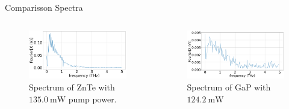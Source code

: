 \documentclass[aspectratio=1610, 9pt]{beamer}
\begin{document}
\begin{frame}{Comparisson Spectra}
  \begin{columns}
    \begin{column}{.5\textwidth}
  \begin{figure}
    \includegraphics[width=\textwidth]{images/2_11_30_20normalFX.pdf}
    \caption{\textcolor{tugreen}{Spectrum} of ZnTe with $\SI{135.0}{\milli\W}$ pump power.}
  \end{figure}
  \end{column}
  \begin{column}{.5\textwidth}
    \begin{figure}
      \includegraphics[width=\textwidth]{images/GaP14_55_42normalFX.pdf}
      \caption{\textcolor{tugreen}{Spectrum} of GaP with $\SI{124.2}{\milli\W }$}
    \end{figure}    
  \end{column}
  \end{columns}
\end{frame}
\end{document}
